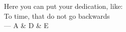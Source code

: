 \thispagestyle{empty}


\vspace*{3cm}
\begin{center}
    Here you can put your dedication, like: \\ \medskip
    To time, that do not go backwards \\ \medskip
    --- A \& D \& E 
\end{center}